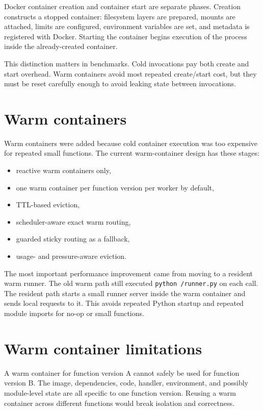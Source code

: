 \documentclass[12pt,a4paper]{report}
\newcommand{\file}[1]{\texttt{#1}}
\begin{document}
Docker container creation and container start are separate phases. Creation
constructs a stopped container: filesystem layers are prepared, mounts are
attached, limits are configured, environment variables are set, and metadata is
registered with Docker. Starting the container begins execution of the process
inside the already-created container.

This distinction matters in benchmarks. Cold invocations pay both create and
start overhead. Warm containers avoid most repeated create/start cost, but they
must be reset carefully enough to avoid leaking state between invocations.

\section{Warm containers}

Warm containers were added because cold container execution was too expensive
for repeated small functions. The current warm-container design has these
stages:

\begin{itemize}[leftmargin=1.2cm]
  \item reactive warm containers only,
  \item one warm container per function version per worker by default,
  \item TTL-based eviction,
  \item scheduler-aware exact warm routing,
  \item guarded sticky routing as a fallback,
  \item usage- and pressure-aware eviction.
\end{itemize}

The most important performance improvement came from moving to a resident warm
runner. The old warm path still executed \file{python /runner.py} on each call.
The resident path starts a small runner server inside the warm container and
sends local requests to it. This avoids repeated Python startup and repeated
module imports for no-op or small functions.

\section{Warm container limitations}

A warm container for function version A cannot safely be used for function
version B. The image, dependencies, code, handler, environment, and possibly
module-level state are all specific to one function version. Reusing a warm
container across different functions would break isolation and correctness.
\end{document}
